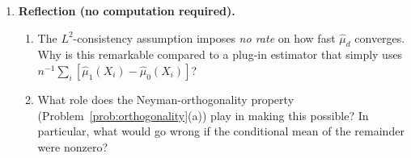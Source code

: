 \documentclass{article}
\theoremstyle{definition}
\begin{document}
\begin{enumerate}
\bigskip

\item \textbf{Reflection (no computation required).}\label{prob:reflect}
  \begin{enumerate}[label=(\alph*)]
    \item The $L^2$-consistency assumption imposes \emph{no rate} on how
      fast $\widehat{\mu}_d$ converges.  Why is this remarkable compared
      to a plug-in estimator that simply uses
      $n^{-1}\sum_i[\widehat{\mu}_1(X_i)-\widehat{\mu}_0(X_i)]$?

    \item What role does the Neyman-orthogonality property
      (Problem~\ref{prob:orthogonality}(a)) play in making this possible?
      In particular, what would go wrong if the conditional mean of the
      remainder were nonzero?
  \end{enumerate}
\end{enumerate}
\end{document}
